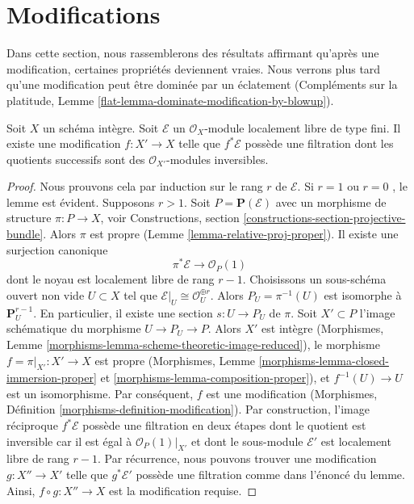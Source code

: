 \section{Modifications}
\label{section-modifications}

\noindent
Dans cette section, nous rassemblerons des résultats affirmant qu'après une
modification, certaines propriétés deviennent vraies. Nous verrons plus tard qu'une
modification peut être dominée par un éclatement (Compléments sur la platitude, Lemme
 \ref{flat-lemma-dominate-modification-by-blowup}).

\begin{lemma}
\label{lemma-filter-after-modification}
Soit  $X$  un schéma intègre. Soit  $\mathcal{E}$  un  $\mathcal{O}_X$-module
localement libre de type fini. Il existe une modification  $f : X' \to X$  telle que
 $f^*\mathcal{E}$  possède une filtration dont les quotients successifs sont des
 $\mathcal{O}_{X'}$-modules inversibles.
\end{lemma}

\begin{proof}
Nous prouvons cela par induction sur le rang  $r$  de  $\mathcal{E}$. Si
 $r = 1$  ou  $r = 0$ , le lemme est évident. Supposons  $r > 1$. Soit
 $P = \mathbf{P}(\mathcal{E})$  avec un morphisme de structure  $\pi : P \to X$, voir Constructions,
section  \ref{constructions-section-projective-bundle}. Alors  $\pi$  est propre (Lemme  \ref{lemma-relative-proj-proper}). Il
existe une surjection canonique
$$
\pi^*\mathcal{E} \to \mathcal{O}_P(1)
$$
dont le noyau est localement libre de rang  $r - 1$. Choisissons un sous-schéma
ouvert non vide  $U \subset X$  tel que  $\mathcal{E}|_U \cong \mathcal{O}_U^{\oplus r}$. Alors  $P_U = \pi^{-1}(U)$  est
isomorphe à  $\mathbf{P}^{r - 1}_U$. En particulier, il existe une section  $s : U \to P_U$  de
 $\pi$. Soit  $X' \subset P$  l'image schématique du morphisme  $U \to P_U \to P$.
Alors  $X'$  est intègre (Morphismes, Lemme  \ref{morphisms-lemma-scheme-theoretic-image-reduced}), le morphisme
 $f = \pi|_{X'} : X' \to X$  est propre (Morphismes, Lemme  \ref{morphisms-lemma-closed-immersion-proper}  et  \ref{morphisms-lemma-composition-proper}), et
 $f^{-1}(U) \to U$  est un isomorphisme. Par conséquent,  $f$  est une
modification (Morphismes, Définition  \ref{morphisms-definition-modification}). Par construction, l'image réciproque
 $f^*\mathcal{E}$  possède une filtration en deux étapes dont le quotient est
inversible car il est égal à  $\mathcal{O}_P(1)|_{X'}$  et dont le sous-module  $\mathcal{E}'$  est
localement libre de rang  $r - 1$. Par récurrence, nous pouvons trouver une
modification  $g : X'' \to X'$  telle que  $g^*\mathcal{E}'$  possède une filtration comme dans
l'énoncé du lemme. Ainsi,  $f \circ g : X'' \to X$  est la modification requise.
\end{proof}

